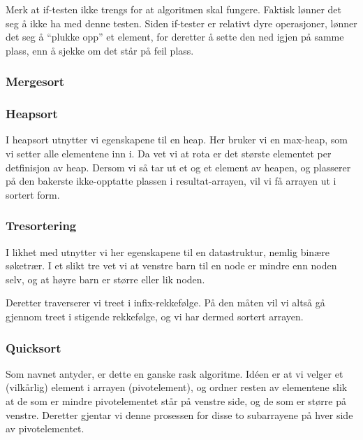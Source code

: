 
Merk at if-testen ikke trengs for at algoritmen skal fungere.
Faktisk lønner det seg å ikke ha med denne testen.
Siden if-tester er relativt dyre operasjoner, lønner det seg å ``plukke opp'' et
element, for deretter å sette den ned igjen på samme plass, enn å sjekke om det
står på feil plass.


\subsubsection{\color{red}Mergesort}\label{mergesort}

\subsubsection{\color{red}Heapsort}\label{heapsort}
I heapsort utnytter vi egenskapene til en heap.
Her bruker vi en max-heap, som vi setter alle elementene inn i. Da vet vi at
rota er det største elementet per detfinisjon av heap. Dersom vi så tar ut et og
et element av heapen, og plasserer på den bakerste ikke-opptatte plassen i
resultat-arrayen, vil vi få arrayen ut i sortert form.

\subsubsection{\color{red}Tresortering}\label{treesort}
I likhet med  utnytter vi her egenskapene til en datastruktur,
nemlig binære søketrær. I et slikt tre vet vi at venstre barn til en node er
mindre enn noden selv, og at høyre barn er større eller lik noden.

Deretter traverserer vi treet i infix-rekkefølge. På den måten vil vi altså gå
gjennom treet i stigende rekkefølge, og vi har dermed sortert arrayen.

\subsubsection{\color{red}Quicksort}
\label{quick}
Som navnet antyder, er dette en ganske rask algoritme.
Idéen er at vi velger et (vilkårlig) element i arrayen (pivotelement), og ordner resten av
elementene slik at de som er mindre pivotelementet står på venstre side, og de
som er større på venstre. Deretter gjentar vi denne prosessen for disse to
subarrayene på hver side av pivotelementet.


